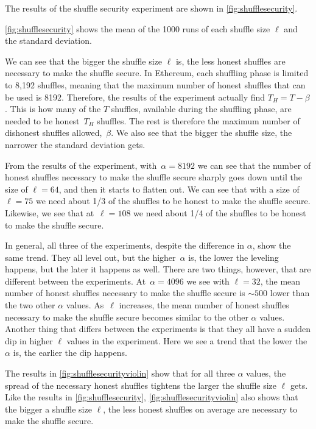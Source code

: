 The results of the shuffle security experiment are shown in \autoref{fig:shufflesecurity}.

\autoref{fig:shufflesecurity} shows the mean of the 1000 runs of each shuffle size $\ell$ and the standard deviation.

We can see that the bigger the shuffle size $\ell$ is, the less honest shuffles are necessary to make the shuffle secure.
In Ethereum, each shuffling phase is limited to 8,192 shuffles, meaning that the maximum number of honest shuffles that can be used is 8192.
Therefore, the results of the experiment actually find $T_H=T-\beta$.
This is how many of the $T$ shuffles, available during the shuffling phase, are needed to be honest~$T_H$ shuffles.
The rest is therefore the maximum number of dishonest shuffles allowed,~$\beta$.
We also see that the bigger the shuffle size, the narrower the standard deviation gets.

From the results of the experiment, with~$\alpha=8192$ we can see that the number of honest shuffles necessary to make the shuffle secure sharply goes down until the size of $\ell=64$, and then it starts to flatten out.
We can see that with a size of $\ell=75$ we need about 1/3 of the shuffles to be honest to make the shuffle secure.
Likewise, we see that at~$\ell=108$ we need about 1/4 of the shuffles to be honest to make the shuffle secure.

In general, all three of the experiments, despite the difference in $\alpha$, show the same trend.
They all level out, but the higher~$\alpha$ is, the lower the leveling happens, but the later it happens as well.
There are two things, however, that are different between the experiments.
At~$\alpha=4096$ we see with $\ell=32$, the mean number of honest shuffles necessary to make the shuffle secure is $\sim 500$ lower than the two other $\alpha$ values.
As~$\ell$ increases, the mean number of honest shuffles necessary to make the shuffle secure becomes similar to the other $\alpha$ values.
Another thing that differs between the experiments is that they all have a sudden dip in higher $\ell$ values in the experiment.
Here we see a trend that the lower the~$\alpha$ is, the earlier the dip happens.



The results in \autoref{fig:shufflesecurityviolin} show that for all three $\alpha$ values, the spread of the necessary honest shuffles tightens the larger the shuffle size $\ell$ gets.
Like the results in \autoref{fig:shufflesecurity}, \autoref{fig:shufflesecurityviolin} also shows that the bigger a shuffle size $\ell$, the less honest shuffles on average are necessary to make the shuffle secure.

